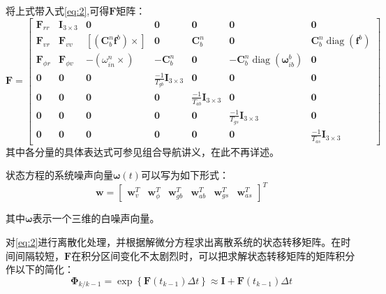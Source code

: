 \documentclass[codepkg=listings,theme=fancy]{course-report}
\begin{document}
将上式带入式\eqref{eq:2},可得$\bm{F}$矩阵：
\begin{equation}
\mathbf{F}=\left[\begin{array}{ccccccc}
\mathbf{F}_{r r} & \mathbf{I}_{3 \times 3} & \mathbf{0} & \mathbf{0} & \mathbf{0} & \mathbf{0} & \mathbf{0} \\
\mathbf{F}_{v r} & \mathbf{F}_{v v} & {\left[\left(\mathbf{C}_{b}^{n} \boldsymbol{f}^{b}\right) \times\right]} & \mathbf{0} & \mathbf{C}_{b}^{n} & \mathbf{0} & \mathbf{C}_{b}^{n} \operatorname{diag}\left(\boldsymbol{f}^{b}\right) \\
\mathbf{F}_{\phi r} & \mathbf{F}_{\phi v} & -\left(\omega_{i n}^{n} \times\right) & -\mathbf{C}_{b}^{n} & \mathbf{0} & -\mathbf{C}_{b}^{n} \operatorname{diag}\left(\boldsymbol{\omega}_{i b}^{b}\right) & \mathbf{0} \\
\mathbf{0} & \mathbf{0} & \mathbf{0} & \frac{-1}{T_{g b}} \mathbf{I}_{3 \times 3} & \mathbf{0} & \mathbf{0} & \mathbf{0} \\
\mathbf{0} & \mathbf{0} & \mathbf{0} & \mathbf{0} & \frac{-1}{T_{a b}} \mathbf{I}_{3 \times 3} & \mathbf{0} & \mathbf{0} \\
\mathbf{0} & \mathbf{0} & \mathbf{0} & \mathbf{0} & \mathbf{0} & \frac{-1}{T_{g s}} \mathbf{I}_{3 \times 3} & \mathbf{0} \\
\mathbf{0} & \mathbf{0} & \mathbf{0} & \mathbf{0} & \mathbf{0} & \mathbf{0} & \frac{-1}{T_{a s}} \mathbf{I}_{3 \times 3}
\end{array}\right]
\label{eq:6}
\end{equation}
其中各分量的具体表达式可参见组合导航讲义，在此不再详述。

状态方程的系统噪声向量$\bm{\omega}(t)$可以写为如下形式：
\begin{equation}
\boldsymbol{w}=\left[\begin{array}{llllll}
\boldsymbol{w}_{v}^{T} & \boldsymbol{w}_{\phi}^{T} & \boldsymbol{w}_{g b}^{T} & \boldsymbol{w}_{a b}^{T} & \boldsymbol{w}_{g s}^{T} & \boldsymbol{w}_{a s}^{T}
\end{array}\right]^{T}
\end{equation}

其中$\bm{\omega}$表示一个三维的白噪声向量。

对\eqref{eq:2}进行离散化处理，并根据解微分方程求出离散系统的状态转移矩阵。在时间间隔较短，$\bm{F}$在积分区间变化不太剧烈时，可以把求解状态转移矩阵的矩阵积分作以下的简化：
\begin{equation}
\bm{\Phi}_{k / k-1}=\exp \left\{\mathbf{F}\left(t_{k-1}\right) \Delta t\right\} \approx \mathbf{I}+\mathbf{F}\left(t_{k-1}\right) \Delta t
\label{eq:8}
\end{equation}
\end{document}
